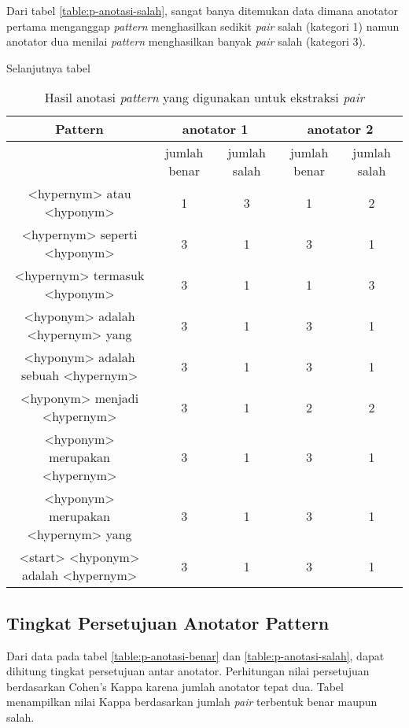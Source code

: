 Dari tabel \ref{table:p-anotasi-salah}, sangat banya ditemukan data dimana anotator pertama menganggap \textit{pattern} menghasilkan sedikit \textit{pair} salah (kategori 1) namun anotator dua menilai \textit{pattern} menghasilkan banyak \textit{pair} salah (kategori 3).

Selanjutnya tabel 
\begin{table}
  \centering
  \caption{Hasil anotasi \textit{pattern} yang digunakan untuk ekstraksi \textit{pair}}
  \label{table:anotasi-p-used}
  \begin{tabular}{ccccc} 
  \hline
  \multirow{2}{*}{ Pattern } & \multicolumn{2}{c}{ anotator 1 } & \multicolumn{2}{c}{ anotator 2 } \\ \hline
  & jumlah benar & jumlah salah & jumlah benar & jumlah salah \\ \hline
  <hypernym> atau <hyponym> & 1 & 3 & 1 & 2 \\ \hline
  <hypernym> seperti <hyponym> & 3 & 1 & 3 & 1 \\ \hline
  <hypernym> termasuk <hyponym> & 3 & 1 & 1 & 3 \\ \hline
  <hyponym> adalah <hypernym> yang & 3 & 1 & 3 & 1 \\ \hline
  <hyponym> adalah sebuah <hypernym> & 3 & 1 & 3 & 1 \\ \hline
  <hyponym> menjadi <hypernym> & 3 & 1 & 2 & 2 \\ \hline
  <hyponym> merupakan <hypernym> & 3 & 1 & 3 & 1 \\ \hline
  <hyponym> merupakan <hypernym> yang & 3 & 1 & 3 & 1 \\ \hline
  <start> <hyponym> adalah <hypernym> & 3 & 1 & 3 & 1 \\ \hline
  \end{tabular} 
\end{table}

\subsection{Tingkat Persetujuan Anotator Pattern}
Dari data pada tabel \ref{table:p-anotasi-benar} dan \ref{table:p-anotasi-salah}, dapat dihitung tingkat persetujuan antar anotator. Perhitungan nilai persetujuan berdasarkan Cohen's Kappa karena jumlah anotator tepat dua. Tabel menampilkan nilai Kappa berdasarkan jumlah \textit{pair} terbentuk benar maupun salah.

